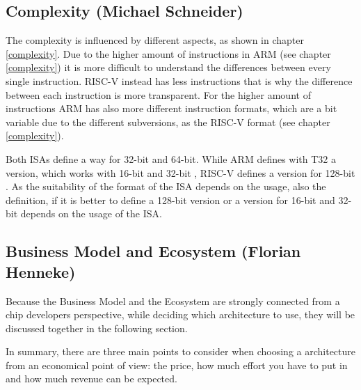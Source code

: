 \documentclass[conference]{IEEEtran}
\begin{document}
	\subsection{Complexity (Michael Schneider)}
	The complexity is influenced by different aspects, as shown in chapter \ref{complexity}.
	 Due to the higher amount of instructions in ARM (see chapter \ref{complexity}) it is more difficult to understand the differences between every single instruction. RISC-V instead has less instructions that is why the difference between each instruction is more transparent. 
	 For the higher amount of instructions ARM has also more different instruction formats, which are a bit variable due to the different subversions, as the RISC-V format (see chapter \ref{complexity}).
	
	Both \glspl{ISA} define a way for 32-bit and 64-bit. While ARM defines with T32 a version, which works with 16-bit and 32-bit \cite[page 38]{Arm2020}, RISC-V defines a version for 128-bit \cite[page 3ff]{Waterman2017}. As the suitability of the format of the \gls{ISA} depends on the usage, also the definition, if it is better to define a 128-bit version or a version for 16-bit and 32-bit depends on the usage of the \gls{ISA}.

	\subsection{Business Model and Ecosystem (Florian Henneke)}
	Because the Business Model and the Ecosystem are strongly connected from a chip developers perspective, while deciding which architecture to use, they will be discussed together in the following section.

	In summary, there are three main points to consider when choosing a architecture from an economical point of view: the price, how much effort you have to put in and how much revenue can be expected.
\end{document}
